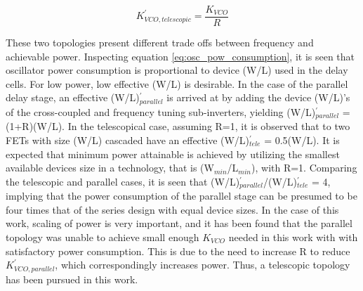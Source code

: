 			\begin{equation}\label{eq:series_kvco}
				K_{VCO, telescopic}^{'} = \frac{K_{VCO}}{R}
			\end{equation}

			These two topologies present different trade offs between frequency and achievable power. Inspecting equation \ref{eq:osc_pow_consumption}, it is seen that oscillator power consumption is proportional to device (W/L) used in the delay cells. For low power, low effective (W/L) is desirable. In the case of the parallel delay stage, an effective (W/L)$_{parallel}^{'}$ is arrived at by adding the device (W/L)'s of the cross-coupled and frequency tuning sub-inverters, yielding (W/L)$_{parallel}^{'}$ = (1+R)(W/L). In the telescopical case, assuming R=1, it is observed that to two FETs with size (W/L) cascaded have an effective (W/L)$_{tele}^{'}$ = 0.5(W/L). It is expected that minimum power attainable is achieved by utilizing the smallest available devices size in a technology, that is (W$_{min}$/L$_{min}$), with R=1. Comparing the telescopic and parallel cases, it is seen that (W/L)$_{parallel}^{'}$/(W/L)$_{tele}^{'}$ = 4, implying that the power consumption of the parallel stage can be presumed to be four times that of the series design with equal device sizes. In the case of this work, scaling of power is very important, and it has been found that the parallel topology was unable to achieve small enough $K_{VCO}$ needed in this work with with satisfactory power consumption. This is due to the need to increase R to reduce $K_{VCO,parallel}^{'}$, which correspondingly increases power. Thus, a telescopic topology has been pursued in this work.




